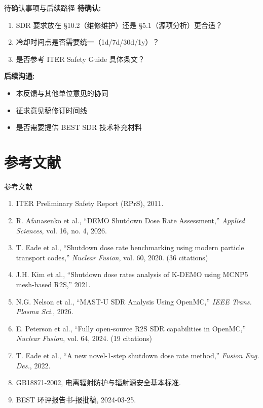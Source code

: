 \documentclass[aspectratio=169]{ctexbeamer}
\begin{document}
\begin{frame}{待确认事项与后续路径}
	\textbf{待确认:}
	\begin{enumerate}
		\item SDR 要求放在 §10.2（维修维护）还是 §5.1（源项分析）更合适？
		\item 冷却时间点是否需要统一（1d/7d/30d/1y）？
		\item 是否参考 ITER Safety Guide 具体条文？
	\end{enumerate}

	\vspace{12pt}
	\textbf{后续沟通:}
	\begin{itemize}
		\item 本反馈与其他单位意见的协同
		\item 征求意见稿修订时间线
		\item 是否需要提供 BEST SDR 技术补充材料
	\end{itemize}
\end{frame}

\section{参考文献}

\begin{frame}[allowframebreaks]{参考文献}
	\small
	\begin{enumerate}
		\item ITER Preliminary Safety Report (RPrS), 2011.
		\item R. Afanasenko et al., ``DEMO Shutdown Dose Rate Assessment,'' \textit{Applied Sciences}, vol. 16, no. 4, 2026.
		\item T. Eade et al., ``Shutdown dose rate benchmarking using modern particle transport codes,'' \textit{Nuclear Fusion}, vol. 60, 2020. (36 citations)
		\item J.H. Kim et al., ``Shutdown dose rates analysis of K-DEMO using MCNP5 mesh-based R2S,'' 2021.
		\item N.G. Nelson et al., ``MAST-U SDR Analysis Using OpenMC,'' \textit{IEEE Trans. Plasma Sci.}, 2026.
		\item E. Peterson et al., ``Fully open-source R2S SDR capabilities in OpenMC,'' \textit{Nuclear Fusion}, vol. 64, 2024. (19 citations)
		\item T. Eade et al., ``A new novel-1-step shutdown dose rate method,'' \textit{Fusion Eng. Des.}, 2022.
		\item GB18871-2002, 电离辐射防护与辐射源安全基本标准.
		\item BEST 环评报告书-报批稿, 2024-03-25.
	\end{enumerate}
\end{frame}

\end{document}
